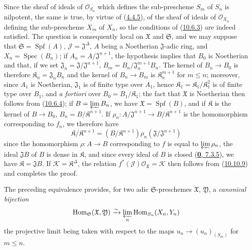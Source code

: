 Since the sheaf of ideals of $\mathscr{O}_{S_n}$ which defines the
sub-prescheme $S_m$ of $S_n$ is nilpotent, the same is true, by virtue of
(\hyperref[I.4.4.5]{4.4.5}), of the sheaf of ideals of
$\mathscr{O}_{X_n}$ defining the sub-prescheme $X_m$ of $X_n$, so the
conditions of (\hyperref[I.10.6.3]{10.6.3}) are indeed satisfied. The
question is consequently local on $\mathfrak{X}$ and $\mathfrak{S}$, and we
may suppose that $\mathfrak{S}=\operatorname{Spf}(A)$,
$\mathscr{J}=\mathfrak{J}^\Delta$, $A$ being a Noetherian
$\mathfrak{J}$-adic ring, and $X_n=\operatorname{Spec}(B_n)$; if
$A_n=A/\mathfrak{J}^{n+1}$, the hypothesis implies that $B_0$ is Noetherian
and that, if we set $\mathfrak{J}_n=\mathfrak{J}/\mathfrak{J}^{n+1}$,
$B_m=B_n/\mathfrak{J}_n^{m+1}B_n$. The kernel of $B_n\to B_0$ is therefore
$\mathfrak{K}_n=\mathfrak{J}_nB_n$ and the kernel of $B_n\to B_m$ is
$\mathfrak{K}_n^{m+1}$ for $m\leq n$; moreover, since $A_1$ is
Noetherian, $\mathfrak{J}_1$ is of finite type over $A_1$, hence
$\mathfrak{K}_1=\mathfrak{K}_1/\mathfrak{K}_1^2$ is of finite type
over $B_1$, and \emph{a fortiori} over
$B_0=B_1/\mathfrak{K}_1$; the fact that $\mathfrak{X}$ is Noetherian
then follows from (\hyperref[I.10.6.4]{10.6.4}); if
$B=\varprojlim B_n$, we have $\mathfrak{X}=\operatorname{Spf}(B)$, and if
$\mathfrak{K}$ is the kernel of $B\to B_0$,
$B_n=B/\mathfrak{K}^{n+1}$. If
$\rho_n:A/\mathfrak{J}^{n+1}\to B/\mathfrak{K}^{n+1}$ is the homomorphism
corresponding to $f_n$, we therefore have
\[
  \mathfrak{K}/\mathfrak{K}^{n+1}
  =(B/\mathfrak{K}^{n+1})\rho_n(\mathfrak{J}/\mathfrak{J}^{n+1})
\]
since the homomorphism $\rho:A\to B$ corresponding to $f$ is equal to
$\varprojlim\rho_n$, the ideal $\mathfrak{J}B$ of $B$ is dense in
$\mathfrak{K}$, and since every ideal of $B$ is closed
(\hyperref[0.7.3.5]{\textbf{0}, 7.3.5}), we have $\mathfrak{K}=\mathfrak{J}B$. If
$\mathscr{K}=\mathfrak{K}^\Delta$, the relation
$f^*(\mathscr{J})\mathscr{O}_{\mathfrak{X}}=\mathscr{K}$ then follows from
(\hyperref[I.10.10.9]{10.10.9}) and completes the proof.

\begin{env}[10.12.3.2]
\label{I.10.12.3.2}
The preceding equivalence provides, for two adic $\mathfrak{S}$-preschemes
$\mathfrak{X}$, $\mathfrak{Y}$, a \emph{canonical bijection}
\[
  \operatorname{Hom}_{\mathfrak{S}}(\mathfrak{X},\mathfrak{Y})
  \xrightarrow{\sim}
  \varprojlim_n\operatorname{Hom}_{S_n}(X_n,Y_n)
\]
the projective limit being taken with respect to the maps
$u_n\to(u_n)_{(S_m)}$ for $m\leq n$.
\end{env}

